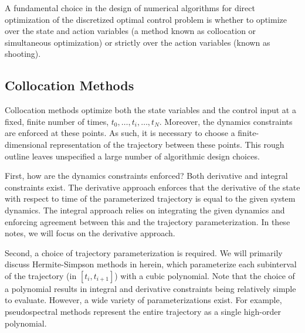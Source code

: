 A fundamental choice in the design of numerical algorithms for direct optimization of the discretized optimal control problem is whether to optimize over the state and action variables (a method known as collocation or simultaneous optimization) or strictly over the action variables (known as shooting).

\subsection{Collocation Methods}

Collocation methods optimize both the state variables and the control input at a fixed, finite number of times, $t_0, \ldots, t_i, \ldots, t_N$. Moreover, the dynamics constraints are enforced at these points. As such, it is necessary to choose a finite-dimensional representation of the trajectory between these points. This rough outline leaves unspecified a large number of algorithmic design choices. 

First, how are the dynamics constraints enforced? Both derivative and integral constraints exist. The derivative approach enforces that the derivative of the state with respect to time of the parameterized trajectory is equal to the given system dynamics. The integral approach relies on integrating the given dynamics and enforcing agreement between this and the trajectory parameterization. In these notes, we will focus on the derivative approach. 

Second, a choice of trajectory parameterization is required. We will primarily discuss Hermite-Simpson methods in herein, which parameterize each subinterval of the trajectory (in $[t_i, t_{i+1}]$) with a cubic polynomial. Note that the choice of a polynomial results in integral and derivative constraints being relatively simple to evaluate. However, a wide variety of parameterizations exist. For example, pseudospectral methods represent the entire trajectory as a single high-order polynomial. 

